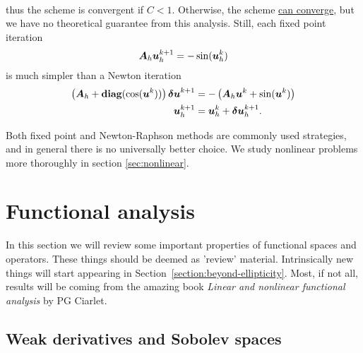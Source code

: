 \documentclass{article}
\renewcommand{\vec}{\vectorsym}
\newcommand{\mat}{\matrixsym}
\begin{document}
\begin{enumerate}
\begin{align*}
    \end{align*}
    thus the scheme is convergent if $C<1$. Otherwise, the scheme \underline{can converge}, but we have no theoretical guarantee from this analysis. Still, each fixed point iteration
    $$
    \mat A_h \vec u_h^{k+1} = - \sin(\vec u_h^k)
    $$
    is much simpler than a Newton iteration
    \begin{align*}
        \left(\mat A_h + \textbf{diag}(\cos(\vec u^k))\right)\vec{\delta u}^{k+1} &= -\left(\mat A_h \vec{u}^k + \sin(\vec u^k)\right)\\
        \vec u_h^{k+1} &= \vec{u}^k_h + \vec{\delta u}_h^{k+1}.
    \end{align*}
\end{enumerate}
Both fixed point and Newton-Raphson methods are commonly used strategies, and in general there is no universally better choice. We study nonlinear problems more thoroughly in section \ref{sec:nonlinear}.

\section{Functional analysis}
In this section we will review some important properties of functional spaces and operators. These things should be deemed as 'review' material. Intrinsically new things will start appearing in Section~\ref{section:beyond-ellipticity}. Most, if not all, results will be coming from the amazing book \emph{Linear and nonlinear functional analysis} by PG Ciarlet.

\subsection{Weak derivatives and Sobolev spaces}
\end{document}
